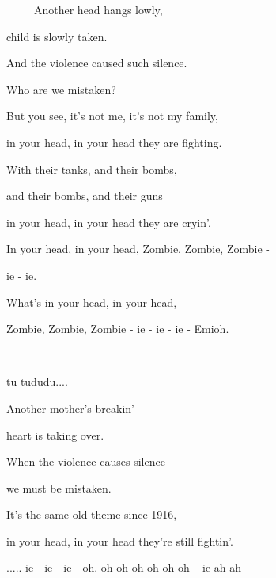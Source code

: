 


  ~  ~  ~ 
\zs 
Another head hangs lowly, 

child is slowly taken.
 
And the violence caused such silence.
 
Who are we mistaken?
 
But you see, it's not me, it's not my family,

in your head, in your head they are fighting.
\ks

\zr 
With their tanks, and their bombs,

and their bombs, and their guns

in your head, in your head they are cryin'.
 
In your head, in your head, Zombie, Zombie, Zombie - 

ie - ie. 

What's in your head, in your head,

Zombie, Zombie, Zombie - ie - ie - ie - Emioh. 

 ~  ~  ~  ~  ~  ~ 

tu tududu.... 
\kr

\zs
Another mother's breakin' 

heart is taking over. 

When the violence causes silence 

we must be mistaken. 

It's the same old theme since 1916, 

in your head, in your head they're still fightin'. 
\ks

\zr
..... ie - ie - ie - oh. oh oh oh oh oh oh ~ ie-ah ah ~ ~ ~
\kr 

\kp
